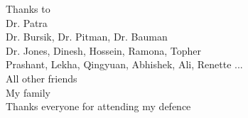 \documentclass{beamer}
\begin{document}
%
\begin{frame}{}
\center
\huge{
Thanks to \\}
\Large
{
Dr. Patra \\
Dr. Bursik, Dr. Pitman, Dr. Bauman \\
Dr. Jones, Dinesh, Hossein, Ramona, Topher \\
Prashant, Lekha, Qingyuan, Abhishek, Ali, Renette ...\\
All other friends \\
My family \\
Thanks everyone for attending my defence
}
\end{frame}


%
%    
%    
%
% 
%    
%
\end{document}
